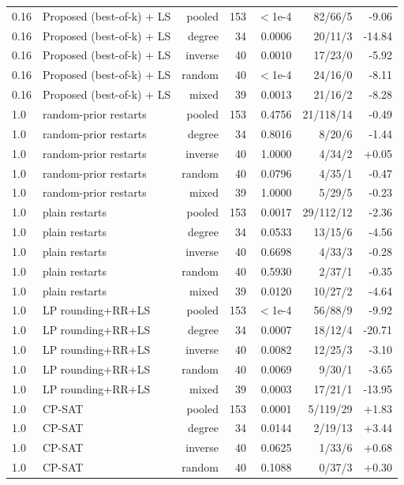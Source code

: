 \begin{table}[t]
\begin{tabular}{llrrrrr}
0.16 & Proposed (best-of-k) + LS & pooled & 153 & $<$1e-4 & 82/66/5 & -9.06 \\
0.16 & Proposed (best-of-k) + LS & degree & 34 & 0.0006 & 20/11/3 & -14.84 \\
0.16 & Proposed (best-of-k) + LS & inverse & 40 & 0.0010 & 17/23/0 & -5.92 \\
0.16 & Proposed (best-of-k) + LS & random & 40 & $<$1e-4 & 24/16/0 & -8.11 \\
0.16 & Proposed (best-of-k) + LS & mixed & 39 & 0.0013 & 21/16/2 & -8.28 \\
1.0 & random-prior restarts & pooled & 153 & 0.4756 & 21/118/14 & -0.49 \\
1.0 & random-prior restarts & degree & 34 & 0.8016 & 8/20/6 & -1.44 \\
1.0 & random-prior restarts & inverse & 40 & 1.0000 & 4/34/2 & +0.05 \\
1.0 & random-prior restarts & random & 40 & 0.0796 & 4/35/1 & -0.47 \\
1.0 & random-prior restarts & mixed & 39 & 1.0000 & 5/29/5 & -0.23 \\
1.0 & plain restarts & pooled & 153 & 0.0017 & 29/112/12 & -2.36 \\
1.0 & plain restarts & degree & 34 & 0.0533 & 13/15/6 & -4.56 \\
1.0 & plain restarts & inverse & 40 & 0.6698 & 4/33/3 & -0.28 \\
1.0 & plain restarts & random & 40 & 0.5930 & 2/37/1 & -0.35 \\
1.0 & plain restarts & mixed & 39 & 0.0120 & 10/27/2 & -4.64 \\
1.0 & LP rounding+RR+LS & pooled & 153 & $<$1e-4 & 56/88/9 & -9.92 \\
1.0 & LP rounding+RR+LS & degree & 34 & 0.0007 & 18/12/4 & -20.71 \\
1.0 & LP rounding+RR+LS & inverse & 40 & 0.0082 & 12/25/3 & -3.10 \\
1.0 & LP rounding+RR+LS & random & 40 & 0.0069 & 9/30/1 & -3.65 \\
1.0 & LP rounding+RR+LS & mixed & 39 & 0.0003 & 17/21/1 & -13.95 \\
1.0 & CP-SAT & pooled & 153 & 0.0001 & 5/119/29 & +1.83 \\
1.0 & CP-SAT & degree & 34 & 0.0144 & 2/19/13 & +3.44 \\
1.0 & CP-SAT & inverse & 40 & 0.0625 & 1/33/6 & +0.68 \\
1.0 & CP-SAT & random & 40 & 0.1088 & 0/37/3 & +0.30 \\

\end{tabular}
\end{table}
